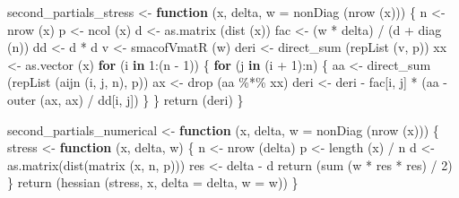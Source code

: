 \documentclass[
  12pt,
]{book}
\newenvironment{Shaded}{\begin{snugshade}}{\end{snugshade}}
\newcommand{\AttributeTok}[1]{\textcolor[rgb]{0.77,0.63,0.00}{#1}}
\newcommand{\ControlFlowTok}[1]{\textcolor[rgb]{0.13,0.29,0.53}{\textbf{#1}}}
\newcommand{\DecValTok}[1]{\textcolor[rgb]{0.00,0.00,0.81}{#1}}
\newcommand{\FunctionTok}[1]{\textcolor[rgb]{0.00,0.00,0.00}{#1}}
\newcommand{\NormalTok}[1]{#1}
\newcommand{\OtherTok}[1]{\textcolor[rgb]{0.56,0.35,0.01}{#1}}
\newcommand{\SpecialCharTok}[1]{\textcolor[rgb]{0.00,0.00,0.00}{#1}}
\theoremstyle{definition}
\theoremstyle{definition}
\theoremstyle{definition}
\theoremstyle{definition}
\theoremstyle{remark}
\begin{document}
\begin{Shaded}
\begin{Highlighting}[]
\NormalTok{second\_partials\_stress }\OtherTok{\textless{}{-}}
  \ControlFlowTok{function}\NormalTok{ (x, delta, }\AttributeTok{w =} \FunctionTok{nonDiag}\NormalTok{ (}\FunctionTok{nrow}\NormalTok{ (x))) \{}
\NormalTok{    n }\OtherTok{\textless{}{-}} \FunctionTok{nrow}\NormalTok{ (x)}
\NormalTok{    p }\OtherTok{\textless{}{-}} \FunctionTok{ncol}\NormalTok{ (x)}
\NormalTok{    d }\OtherTok{\textless{}{-}} \FunctionTok{as.matrix}\NormalTok{ (}\FunctionTok{dist}\NormalTok{ (x))}
\NormalTok{    fac }\OtherTok{\textless{}{-}}\NormalTok{ (w }\SpecialCharTok{*}\NormalTok{ delta) }\SpecialCharTok{/}\NormalTok{ (d }\SpecialCharTok{+} \FunctionTok{diag}\NormalTok{ (n))}
\NormalTok{    dd }\OtherTok{\textless{}{-}}\NormalTok{ d }\SpecialCharTok{*}\NormalTok{ d}
\NormalTok{    v }\OtherTok{\textless{}{-}} \FunctionTok{smacofVmatR}\NormalTok{ (w)}
\NormalTok{    deri }\OtherTok{\textless{}{-}} \FunctionTok{direct\_sum}\NormalTok{ (}\FunctionTok{repList}\NormalTok{ (v, p))}
\NormalTok{    xx }\OtherTok{\textless{}{-}} \FunctionTok{as.vector}\NormalTok{ (x)}
    \ControlFlowTok{for}\NormalTok{ (i }\ControlFlowTok{in} \DecValTok{1}\SpecialCharTok{:}\NormalTok{(n }\SpecialCharTok{{-}} \DecValTok{1}\NormalTok{)) \{}
      \ControlFlowTok{for}\NormalTok{ (j }\ControlFlowTok{in}\NormalTok{ (i }\SpecialCharTok{+} \DecValTok{1}\NormalTok{)}\SpecialCharTok{:}\NormalTok{n) \{}
\NormalTok{        aa }\OtherTok{\textless{}{-}} \FunctionTok{direct\_sum}\NormalTok{ (}\FunctionTok{repList}\NormalTok{ (}\FunctionTok{aijn}\NormalTok{ (i, j, n), p))}
\NormalTok{        ax }\OtherTok{\textless{}{-}} \FunctionTok{drop}\NormalTok{ (aa }\SpecialCharTok{\%*\%}\NormalTok{ xx)}
\NormalTok{        deri }\OtherTok{\textless{}{-}}\NormalTok{ deri }\SpecialCharTok{{-}}\NormalTok{ fac[i, j] }\SpecialCharTok{*}\NormalTok{ (aa }\SpecialCharTok{{-}} \FunctionTok{outer}\NormalTok{ (ax, ax) }\SpecialCharTok{/}\NormalTok{ dd[i, j])}
\NormalTok{      \}}
\NormalTok{    \}}
    \FunctionTok{return}\NormalTok{ (deri)}
\NormalTok{  \}}

\NormalTok{second\_partials\_numerical }\OtherTok{\textless{}{-}}
  \ControlFlowTok{function}\NormalTok{ (x, delta, }\AttributeTok{w =} \FunctionTok{nonDiag}\NormalTok{ (}\FunctionTok{nrow}\NormalTok{ (x))) \{}
\NormalTok{    stress }\OtherTok{\textless{}{-}} \ControlFlowTok{function}\NormalTok{ (x, delta, w) \{}
\NormalTok{      n }\OtherTok{\textless{}{-}} \FunctionTok{nrow}\NormalTok{ (delta)}
\NormalTok{      p }\OtherTok{\textless{}{-}} \FunctionTok{length}\NormalTok{ (x) }\SpecialCharTok{/}\NormalTok{ n}
\NormalTok{      d }\OtherTok{\textless{}{-}} \FunctionTok{as.matrix}\NormalTok{(}\FunctionTok{dist}\NormalTok{(}\FunctionTok{matrix}\NormalTok{ (x, n, p)))}
\NormalTok{      res }\OtherTok{\textless{}{-}}\NormalTok{ delta }\SpecialCharTok{{-}}\NormalTok{ d}
      \FunctionTok{return}\NormalTok{ (}\FunctionTok{sum}\NormalTok{ (w }\SpecialCharTok{*}\NormalTok{ res }\SpecialCharTok{*}\NormalTok{ res) }\SpecialCharTok{/} \DecValTok{2}\NormalTok{)}
\NormalTok{    \}}
    \FunctionTok{return}\NormalTok{ (}\FunctionTok{hessian}\NormalTok{ (stress, x, }\AttributeTok{delta =}\NormalTok{ delta, }\AttributeTok{w =}\NormalTok{ w))}
\NormalTok{  \}}


\end{Highlighting}
\end{Shaded}
\end{document}
